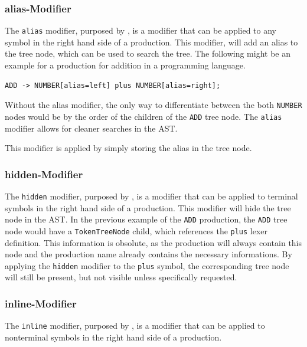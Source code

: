 \subsubsection{alias-Modifier}

The \verb|alias| modifier, purposed by \cite{GeneratingRewritableAST}, is a modifier that can be applied to any symbol in the right hand side of a production. This modifier, will add an alias to the tree node, which can be used to search the tree. The following might be an example for a production for addition in a programming language.

\begin{verbatim}
ADD -> NUMBER[alias=left] plus NUMBER[alias=right];
\end{verbatim}

Without the alias modifier, the only way to differentiate between the both \verb|NUMBER| nodes would be by the order of the children of the \verb|ADD| tree node. The \verb|alias| modifier allows for cleaner searches in the AST.

This modifier is applied by simply storing the alias in the tree node.


\subsubsection{hidden-Modifier}

The \verb|hidden| modifier, purposed by \cite{GeneratingRewritableAST}, is a modifier that can be applied to terminal symbols in the right hand side of a production. This modifier will hide the tree node in the AST. In the previous example of the \verb|ADD| production, the \verb|ADD| tree node would have a \verb|TokenTreeNode| child, which references the \verb|plus| lexer definition. This information is obsolute, as the production will always contain this node and the production name already contains the necessary informations. By applying the \verb|hidden| modifier to the \verb|plus| symbol, the corresponding tree node will still be present, but not visible unless specifically requested.

\subsubsection{inline-Modifier}

The \verb|inline| modifier, purposed by \cite{GeneratingRewritableAST}, is a modifier that can be applied to nonterminal symbols in the right hand side of a production. 

